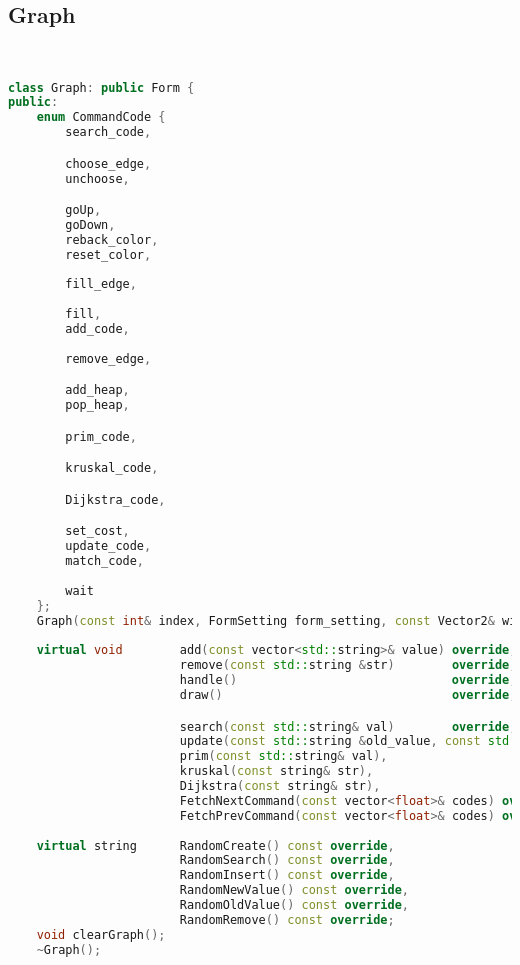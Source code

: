 \subsection{Graph}
\begin{lstlisting}[language=C++]


class Graph: public Form {
public:
    enum CommandCode {
        search_code,

        choose_edge,
        unchoose,

        goUp,
        goDown,
        reback_color,
        reset_color,
        
        fill_edge,
        
        fill,
        add_code,
        
        remove_edge,

        add_heap,
        pop_heap,

        prim_code,

        kruskal_code,

        Dijkstra_code,

        set_cost,
        update_code,
        match_code,
        
        wait
    };
    Graph(const int& index, FormSetting form_setting, const Vector2& window_size);
    
    virtual void        add(const vector<std::string>& value) override,
                        remove(const std::string &str)        override,
                        handle()                              override,
                        draw()                                override,

                        search(const std::string& val)        override,
                        update(const std::string &old_value, const std::string &new_value) override,
                        prim(const std::string& val),
                        kruskal(const string& str),
                        Dijkstra(const string& str),
                        FetchNextCommand(const vector<float>& codes) override,
                        FetchPrevCommand(const vector<float>& codes) override;
                        
    virtual string      RandomCreate() const override,
                        RandomSearch() const override,
                        RandomInsert() const override,
                        RandomNewValue() const override,
                        RandomOldValue() const override,
                        RandomRemove() const override;
    void clearGraph();
    ~Graph();
  

\end{lstlisting}
